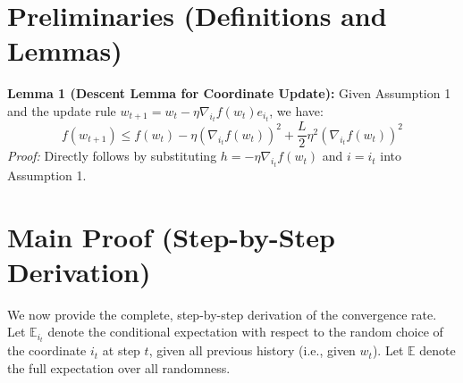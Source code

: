 \documentclass[11pt]{article}
\begin{document}
\section*{Preliminaries (Definitions and Lemmas)}
\textbf{Lemma 1 (Descent Lemma for Coordinate Update):}
Given Assumption 1 and the update rule $w_{t+1} = w_t - \eta \nabla_{i_t} f(w_t) e_{i_t}$, we have:
\begin{equation}
    f(w_{t+1}) \leq f(w_t) - \eta (\nabla_{i_t} f(w_t))^2 + \frac{L}{2} \eta^2 (\nabla_{i_t} f(w_t))^2
\end{equation}
\textit{Proof:} Directly follows by substituting $h = -\eta \nabla_{i_t} f(w_t)$ and $i = i_t$ into Assumption 1.

\section*{Main Proof (Step-by-Step Derivation)}

We now provide the complete, step-by-step derivation of the convergence rate. Let $\mathbb{E}_{i_t}$ denote the conditional expectation with respect to the random choice of the coordinate $i_t$ at step $t$, given all previous history (i.e., given $w_t$). Let $\mathbb{E}$ denote the full expectation over all randomness.
\end{document}

